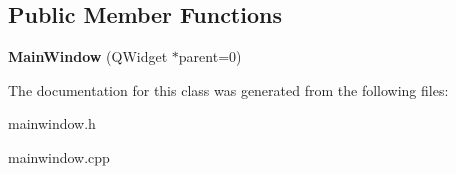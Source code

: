 \subsection*{Public Member Functions}
\begin{DoxyCompactItemize}
\item 
\hypertarget{class_main_window_a8b244be8b7b7db1b08de2a2acb9409db}{{\bfseries Main\-Window} (Q\-Widget $\ast$parent=0)}\label{class_main_window_a8b244be8b7b7db1b08de2a2acb9409db}

\end{DoxyCompactItemize}


The documentation for this class was generated from the following files\-:\begin{DoxyCompactItemize}
\item 
mainwindow.\-h\item 
mainwindow.\-cpp\end{DoxyCompactItemize}
